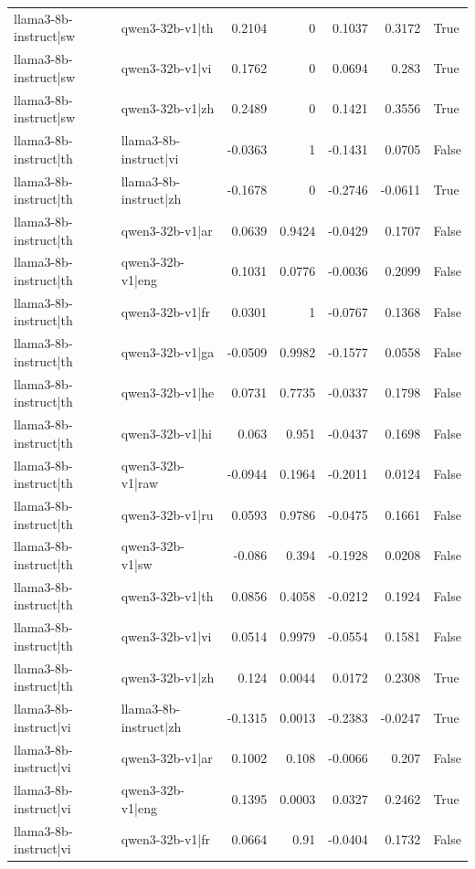 \begin{table}
\begin{tabular}{l l r r r r l}
llama3-8b-instruct|sw & qwen3-32b-v1|th & 0.2104 & 0 & 0.1037 & 0.3172 & True \\
llama3-8b-instruct|sw & qwen3-32b-v1|vi & 0.1762 & 0 & 0.0694 & 0.283 & True \\
llama3-8b-instruct|sw & qwen3-32b-v1|zh & 0.2489 & 0 & 0.1421 & 0.3556 & True \\
llama3-8b-instruct|th & llama3-8b-instruct|vi & -0.0363 & 1 & -0.1431 & 0.0705 & False \\
llama3-8b-instruct|th & llama3-8b-instruct|zh & -0.1678 & 0 & -0.2746 & -0.0611 & True \\
llama3-8b-instruct|th & qwen3-32b-v1|ar & 0.0639 & 0.9424 & -0.0429 & 0.1707 & False \\
llama3-8b-instruct|th & qwen3-32b-v1|eng & 0.1031 & 0.0776 & -0.0036 & 0.2099 & False \\
llama3-8b-instruct|th & qwen3-32b-v1|fr & 0.0301 & 1 & -0.0767 & 0.1368 & False \\
llama3-8b-instruct|th & qwen3-32b-v1|ga & -0.0509 & 0.9982 & -0.1577 & 0.0558 & False \\
llama3-8b-instruct|th & qwen3-32b-v1|he & 0.0731 & 0.7735 & -0.0337 & 0.1798 & False \\
llama3-8b-instruct|th & qwen3-32b-v1|hi & 0.063 & 0.951 & -0.0437 & 0.1698 & False \\
llama3-8b-instruct|th & qwen3-32b-v1|raw & -0.0944 & 0.1964 & -0.2011 & 0.0124 & False \\
llama3-8b-instruct|th & qwen3-32b-v1|ru & 0.0593 & 0.9786 & -0.0475 & 0.1661 & False \\
llama3-8b-instruct|th & qwen3-32b-v1|sw & -0.086 & 0.394 & -0.1928 & 0.0208 & False \\
llama3-8b-instruct|th & qwen3-32b-v1|th & 0.0856 & 0.4058 & -0.0212 & 0.1924 & False \\
llama3-8b-instruct|th & qwen3-32b-v1|vi & 0.0514 & 0.9979 & -0.0554 & 0.1581 & False \\
llama3-8b-instruct|th & qwen3-32b-v1|zh & 0.124 & 0.0044 & 0.0172 & 0.2308 & True \\
llama3-8b-instruct|vi & llama3-8b-instruct|zh & -0.1315 & 0.0013 & -0.2383 & -0.0247 & True \\
llama3-8b-instruct|vi & qwen3-32b-v1|ar & 0.1002 & 0.108 & -0.0066 & 0.207 & False \\
llama3-8b-instruct|vi & qwen3-32b-v1|eng & 0.1395 & 0.0003 & 0.0327 & 0.2462 & True \\
llama3-8b-instruct|vi & qwen3-32b-v1|fr & 0.0664 & 0.91 & -0.0404 & 0.1732 & False \\

\end{tabular}
\end{table}
